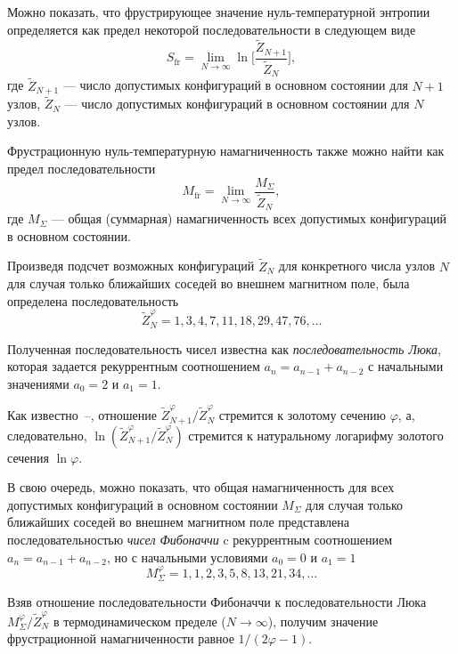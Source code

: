 Можно показать, что фрустрирующее значение нуль-температурной энтропии определяется как предел некоторой последовательности в следующем виде
\begin{equation}
S_{\text{fr}}=\lim_{N\rightarrow \infty} \ln \bigg[\frac{\widetilde{Z}_{N+1}}{\widetilde{Z}_N}\bigg],
\label{41}
\end{equation}
где $\widetilde{Z}_{N+1}$ --- число допустимых конфигураций в основном состоянии для $N+1$ узлов, $\widetilde{Z}_N$ --- число допустимых конфигураций в основном состоянии для $N$ узлов.

Фрустрационную нуль-температурную намагниченность также можно найти как предел последовательности
\begin{equation}
M_{\text{fr}}=\lim_{N\rightarrow \infty}\frac{M_{\Sigma}}{\widetilde{Z}_N},
\label{42}
\end{equation}
где $M_{\Sigma}$ --- общая (суммарная) намагниченность всех допустимых конфигураций в основном состоянии.

Произведя подсчет возможных конфигураций $\widetilde{Z}_{N}$ для конкретного числа узлов $N$ для случая только ближайших соседей во внешнем магнитном поле, была определена последовательность
\[\widetilde{Z}_{N}^{\varphi} = 1, 3, 4, 7, 11, 18, 29, 47, 76, \dots\]  

Полученная последовательность чисел известна как \emph{последовательность Люка}, которая задается рекуррентным соотношением $a_n=a_{n-1}+a_{n-2}$ с начальными значениями $a_0 = 2$ и $a_1 = 1$. 

Как известно~\cite{sloane1973}--\cite{hoggatt1969}, отношение $\widetilde{Z}_{N+1}^{\varphi}/\widetilde{Z}_{N}^{\varphi}$ стремится к золотому сечению $\varphi$, а, следовательно, $\ln (\widetilde{Z}_{N+1}^{\varphi}/\widetilde{Z}_{N}^{\varphi})$ стремится к натуральному логарифму золотого сечения $\ln \varphi$.

В свою очередь, можно показать, что общая намагниченность для всех допустимых конфигураций в основном состоянии $M_{\Sigma}$ для случая только ближайших соседей во внешнем магнитном поле представлена последовательностью \emph{чисел Фибоначчи} c рекуррентным соотношением $a_n=a_{n-1}+a_{n-2}$, но с начальными условиями $a_0 = 0$ и $a_1 = 1$
\[M_{\Sigma}^{\varphi} = 1, 1, 2, 3, 5, 8 , 13, 21, 34, \dots\]

Взяв отношение последовательности Фибоначчи к последовательности Люка $M_{\Sigma}^{\varphi}/\widetilde{Z}_{N}^{\varphi}$ в термодинамическом пределе ($N\rightarrow \infty$), получим значение фрустрационной намагниченности равное $1/(2\varphi-1)$.

